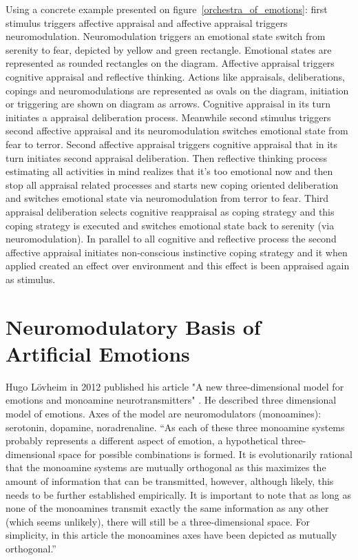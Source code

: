 Using a concrete example presented on figure~\ref{orchestra_of_emotions}: first stimulus triggers affective appraisal and affective appraisal triggers neuromodulation. Neuromodulation triggers an emotional state switch from serenity to fear, depicted by yellow and green rectangle. Emotional states are represented as rounded rectangles on the diagram. Affective appraisal triggers cognitive appraisal and reflective thinking. Actions like appraisals, deliberations, copings and neuromodulations are represented as ovals on the diagram, initiation or triggering are shown on diagram as arrows. Cognitive appraisal in its turn initiates a appraisal deliberation process. Meanwhile second stimulus triggers second affective appraisal and its neuromodulation switches emotional state from fear to terror. Second affective appraisal triggers cognitive appraisal that in its turn initiates second appraisal deliberation. Then reflective thinking process estimating all activities in mind realizes that it's too emotional now and then stop all appraisal related processes and starts new coping oriented deliberation and switches emotional state via neuromodulation from terror to fear. Third appraisal deliberation selects cognitive reappraisal as coping strategy and this coping strategy is executed and switches emotional state back to serenity (via neuromodulation).
In parallel to all cognitive and reflective process the second affective appraisal initiates non-conscious instinctive coping strategy and it when applied created an effect over environment and this effect is been appraised again as stimulus.

\section{Neuromodulatory Basis of Artificial Emotions}

Hugo L\"{o}vheim in 2012 published his article "A new three-dimensional model for emotions and monoamine neurotransmitters" \cite{cubeofemotions}. He described three dimensional model of emotions. Axes of the model are neuromodulators (monoamines): serotonin, dopamine, noradrenaline. ``As each of these three monoamine systems probably represents a different aspect of emotion, a hypothetical three-dimensional space for possible combinations is formed. It is evolutionarily rational that the monoamine systems are mutually orthogonal as this maximizes the amount of information that can be transmitted, however, although likely, this needs to be further established empirically. It is important to note that as long as none of the monoamines transmit exactly the same information as any other (which seems unlikely), there will still be a three-dimensional space. For simplicity, in this article the monoamines axes have been depicted as mutually orthogonal.''

